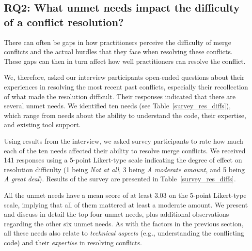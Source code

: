 
\subsection{\textbf{RQ2:} What unmet needs impact the difficulty of a conflict resolution?}\label{RQ2}

There can often be gaps in how practitioners perceive the difficulty of merge conflicts and the actual hurdles that they face when resolving these conflicts. 
These gaps can then in turn affect how well practitioners can resolve the conflict.

We, therefore, asked our interview participants open-ended questions about their experiences in resolving the most recent past conflicts, especially their recollection of what made the resolution difficult.
Their responses indicated that there are several unmet needs. We identified ten needs (see Table~\ref{survey_res_diffs}), which range from needs about the ability to understand the code, their expertise, and existing tool support.  

Using results from the interview, we asked survey participants to rate how much each of the ten needs affected their ability to resolve merge conflicts.
We received 141 responses using a 5-point Likert-type scale indicating the degree of effect on resolution difficulty (1 being \textit{Not at all}, 3 being \textit{A moderate amount}, and 5 being \textit{A great deal}).
Results of the survey are presented in Table~\ref{survey_res_diffs}. 

All the unmet needs have a mean score of at least $3.03$ on the 5-point Likert-type scale, implying that all of them mattered at least a moderate amount.
We present and discuss in detail the top four unmet needs, plus additional observations regarding the other six unmet needs. 
As with the factors in the previous section, all these needs also relate to \textit{technical aspects} (e.g., understanding the conflicting code) and their \textit{expertise} in resolving conflicts.

